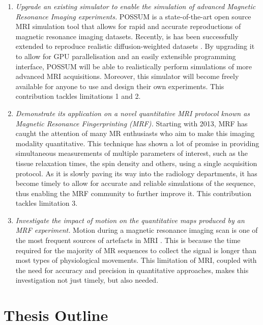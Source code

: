 \begin{enumerate}
	\item \textit{Upgrade an existing simulator to enable the simulation of advanced Magnetic Resonance Imaging experiments.}
	POSSUM \cite{Drobnjak2006} is a state-of-the-art open source MRI simulation tool that allows for rapid and accurate reproductions of magnetic resonance imaging datasets.
	Recently, is has been successfully extended to reproduce realistic diffusion-weighted datasets \cite{Graham2016}.
	By upgrading it to allow for GPU parallelisation and an easily extensible programming interface, POSSUM will be able to realistically perform simulations of more advanced MRI acquisitions.
	Moreover, this simulator will become freely available for anyone to use and design their own experiments. 
	This contribution tackles limitations 1 and 2.
	
	\item \textit{Demonstrate its application on a novel quantitative MRI protocol known as Magnetic Resonance Fingerprinting (MRF).}
	Starting with 2013, MRF has caught the attention of many MR enthusiasts who aim to make this imaging modality quantitative.
	This technique has shown a lot of promise in providing simultaneous measurements of multiple parameters of interest, such as the tissue relaxation times, the spin density and others, using a single acquisition protocol.
	As it is slowly paving its way into the radiology departments, it has become timely to allow for accurate and reliable simulations of the sequence, thus enabling the MRF community to further improve it.
	This contribution tackles limitation 3.

	\item \textit{Investigate the impact of motion on the quantitative maps produced by an MRF experiment.}
	Motion during a magnetic resonance imaging scan is one of the most frequent sources of artefacts in MRI \cite{Zaitsev2015}. 
	This is because the time required for the majority of MR sequences to collect the signal is longer than most types of physiological movements.
	This limitation of MRI, coupled with the need for accuracy and precision in quantitative approaches, makes this investigation not just timely, but also needed.

\end{enumerate}

\section{Thesis Outline}\label{chapterlabel1sec5}

